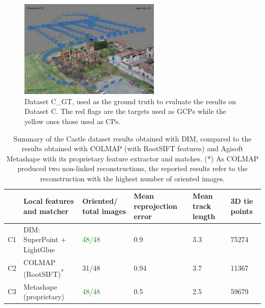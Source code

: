 \begin{figure}
  \centering
    \includegraphics[width=0.6\textwidth]{castle_gt}
  \caption{Dataset C\_GT, used as the ground truth to evaluate the results on Dataset C. The red flags are the targets used as GCPs while the yellow ones those used as CPs.}
  \label{fig:5:castle_gt}
\end{figure}


\begin{table}[ht]
    \centering
    \caption{Summary of the Castle dataset results obtained with DIM, compared to the results obtained with COLMAP (with RootSIFT features) and Agisoft Metashape with its proprietary feature extractor and matches. (*) As COLMAP produced two non-linked reconstructions, the reported results refer to the reconstruction with the highest number of oriented images.} 
    \label{tab:5:castle_statistics}
    
    \begin{tabular}{l p{3.5cm} p{2.2cm} p{2.2cm} p{2.2cm} p{2.2cm}}
    \toprule
    & Local features \newline and matcher & Oriented/ \newline total images & Mean reprojection error \newline [px] & Mean track \newline length &  3D tie points\\
    \midrule
    C1 &DIM: SuperPoint \newline + LightGlue           & \textcolor{green}{48/48}     & 0.9   & 3.3   & 75274 \\
    C2 &COLMAP \newline (RootSIFT)\textsuperscript{*} & 31/48     & 0.94  & 3.7   & 11367 \\
    C3 &Metashape \newline (proprietary)               & \textcolor{green}{48/48}     & 0.5   & 2.5   & 59679 \\ 
    \bottomrule
    \end{tabular}
\end{table}


